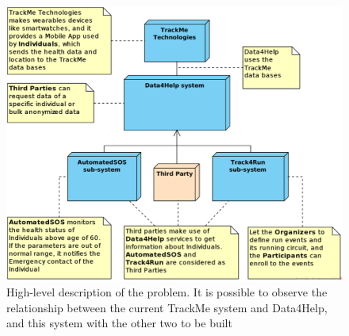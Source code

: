 \documentclass[a4paper, hidelinks, 12pt]{report}
\begin{document}
	\begin{figure}[H]
		\centering
		\includegraphics[width=1\textwidth]{Diagrams/high_level_architecture.png}
		\caption[High-level description of the problem]{High-level description of the problem. It is possible to observe the relationship between the current TrackMe system and Data4Help, and this system with the other two to be built}
		\label{fig:High_level}
	\end{figure}
	
\end{document}
